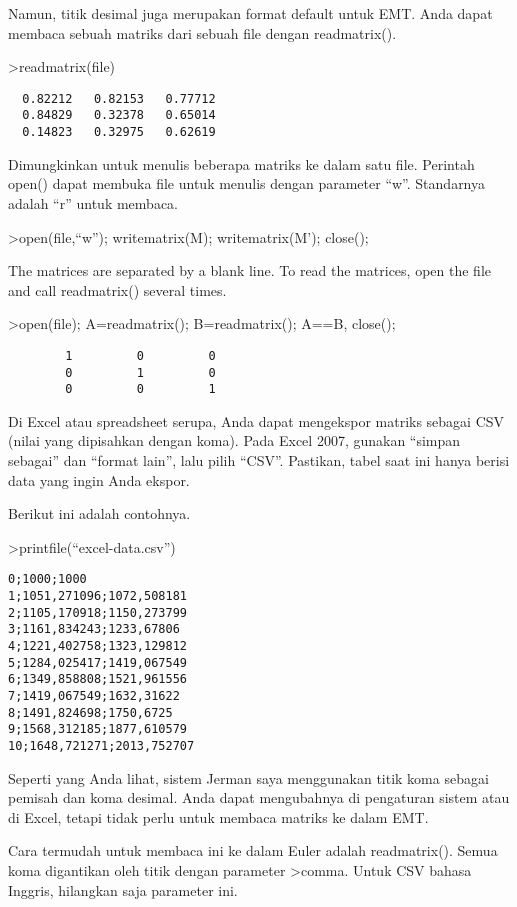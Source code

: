 \documentclass[
]{book}
\begin{document}
Namun, titik desimal juga merupakan format default untuk EMT. Anda dapat membaca sebuah matriks dari sebuah file dengan readmatrix().

\textgreater readmatrix(file)

\begin{verbatim}
  0.82212   0.82153   0.77712 
  0.84829   0.32378   0.65014 
  0.14823   0.32975   0.62619 
\end{verbatim}

Dimungkinkan untuk menulis beberapa matriks ke dalam satu file. Perintah open() dapat membuka file untuk menulis dengan parameter ``w''. Standarnya adalah ``r'' untuk membaca.

\textgreater open(file,``w''); writematrix(M); writematrix(M'); close();

The matrices are separated by a blank line. To read the matrices, open the file and call readmatrix() several times.

\textgreater open(file); A=readmatrix(); B=readmatrix(); A==B, close();

\begin{verbatim}
        1         0         0 
        0         1         0 
        0         0         1 
\end{verbatim}

Di Excel atau spreadsheet serupa, Anda dapat mengekspor matriks sebagai CSV (nilai yang dipisahkan dengan koma). Pada Excel 2007, gunakan ``simpan sebagai'' dan ``format lain'', lalu pilih ``CSV''. Pastikan, tabel saat ini hanya berisi data yang ingin Anda ekspor.

Berikut ini adalah contohnya.

\textgreater printfile(``excel-data.csv'')

\begin{verbatim}
0;1000;1000
1;1051,271096;1072,508181
2;1105,170918;1150,273799
3;1161,834243;1233,67806
4;1221,402758;1323,129812
5;1284,025417;1419,067549
6;1349,858808;1521,961556
7;1419,067549;1632,31622
8;1491,824698;1750,6725
9;1568,312185;1877,610579
10;1648,721271;2013,752707
\end{verbatim}

Seperti yang Anda lihat, sistem Jerman saya menggunakan titik koma sebagai pemisah dan koma desimal. Anda dapat mengubahnya di pengaturan sistem atau di Excel, tetapi tidak perlu untuk membaca matriks ke dalam EMT.

Cara termudah untuk membaca ini ke dalam Euler adalah readmatrix(). Semua koma digantikan oleh titik dengan parameter \textgreater comma. Untuk CSV bahasa Inggris, hilangkan saja parameter ini.
\end{document}
